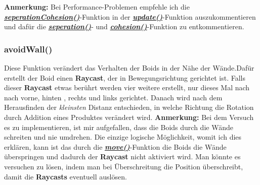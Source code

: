 \documentclass[a4paper, hidelinks, 12pt]{article}
\begin{document}
\scriptsize\textbf{Anmerkung:}
Bei Performance-Problemen empfehle ich die \hyperref[sec:seperationCohesion]{\textbf{\emph{seperationCohesion()}}}-Funktion in der \hyperref[sec:update]{\textbf{\emph{update()}}}-Funktion auszukommentieren und dafür die \hyperref[sec:seperation]{\textbf{\emph{seperation()}}}- und \hyperref[sec:cohesion]{\textbf{\emph{cohesion()}}}-Funktion zu entkommentieren.
\newline

		
\normalsize\subsubsection{avoidWall()}\label{sec:avoidWall}
Diese Funktion verändert das Verhalten der Boids in der Nähe der Wände.\newline Dafür erstellt der Boid einen \textbf{Raycast}\cite{raycast}, der in Bewegungsrichtung gerichtet ist. Falls dieser \textbf{Raycast} etwas berührt werden vier weitere erstellt, nur dieses Mal nach nach vorne, hinten , rechts und links gerichtet. Danach wird nach dem Herausfinden der \emph{kleinsten} Distanz\cite{HitInfo} entschieden, in welche Richtung die Rotation durch Addition eines Produktes verändert wird.\newline\newline
\scriptsize\textbf{Anmerkung:} Bei dem Versuch es zu implementieren, ist mir aufgefallen, dass die Boids durch die Wände schreiten und nie umdrehen. Die einzige logische Möglichkeit, womit ich dies erklären, kann ist das durch die \hyperref[sec:move]{\textbf{\emph{move()}}}-Funktion die Boids die Wände überspringen und dadurch der \textbf{Raycast} nicht aktiviert wird. Man könnte es versuchen zu lösen, indem man bei Überschreitung die Position überschreibt, damit die \textbf{Raycasts} eventuell auslösen.
\newline\newline
	
\end{document}
